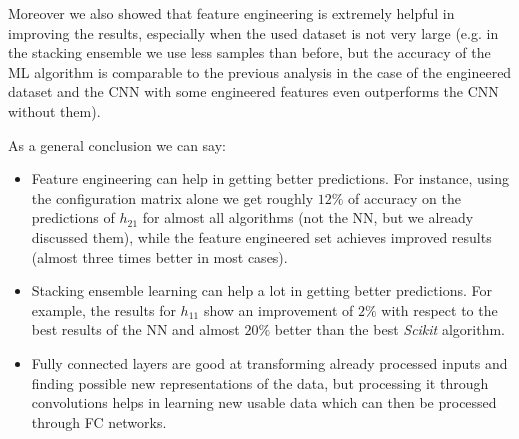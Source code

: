 Moreover we also showed that feature engineering is extremely helpful in improving the results, especially when the used dataset is not very large (e.g. in the stacking ensemble we use less samples than before, but the accuracy of the ML algorithm is comparable to the previous analysis in the case of the engineered dataset and the CNN with some engineered features even outperforms the CNN without them).

As a general conclusion we can say:
\begin{itemize}
    \item Feature engineering can help in getting better predictions. For instance, using the configuration matrix alone we get roughly $12\%$ of accuracy on the predictions of $h_{21}$ for almost all algorithms (not the NN, but we already discussed them), while the feature engineered set achieves improved results (almost three times better in most cases).
    \item Stacking ensemble learning can help a lot in getting better predictions. For example, the results for $h_{11}$ show an improvement  of $2\%$ with respect to the best results of the NN and almost $20\%$ better than the best \textit{Scikit} algorithm.
    \item Fully connected layers are good at transforming already processed inputs and finding possible new representations of the data, but processing it through convolutions helps in learning new usable data which can then be processed through FC networks.
\end{itemize}